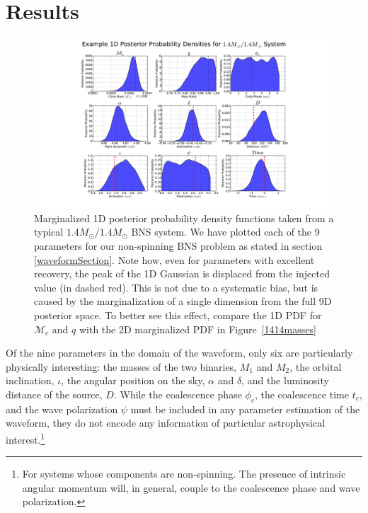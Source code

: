 \documentclass[11pt,a4paper]{emulateapj} 
\begin{document}
\section{Results}
\label{resultsSection} 

\begin{figure}[t!]
\centering \includegraphics[trim=7cm 0cm 0cm 0cm,
  clip=true,scale=0.55]{9dpdf.pdf}
\caption{Marginalized 1D posterior probability density functions taken
  from a typical $1.4M_{\odot}/1.4M_{\odot}$ BNS system.  We have
  plotted each of the 9 parameters for our non-spinning BNS problem as
  stated in section \ref{waveformSection}.  Note how, even for
  parameters with excellent recovery, the peak of the 1D Gaussian is
  displaced from the injected value (in dashed red).  This is not due
  to a systematic bias, but is caused by the marginalization of a
  single dimension from the full 9D posterior space.  To better see
  this effect, compare the 1D PDF for $\mathcal{M}_{c}$ and $q$ with
  the 2D marginalized PDF in Figure~\ref{1414masses}}
\end{figure}

Of the nine parameters in the domain of the waveform, only six are
particularly physically interesting: the masses of the two binaries,
$M_1$ and $M_2$, the orbital inclination, $\iota$, the angular
position on the sky, $\alpha$ and $\delta$, and the luminosity
distance of the source, $D$.  While the coalescence phase $\phi_c$,
the coalescence time $t_c$, and the wave polarization $\psi$ must be
included in any parameter estimation of the waveform, they do not
encode any information of particular astrophysical
interest.\footnote{For systems whose components are non-spinning.  The
  presence of intrinsic angular momentum will, in general, couple to
  the coalescence phase and wave polarization.}
\end{document}
